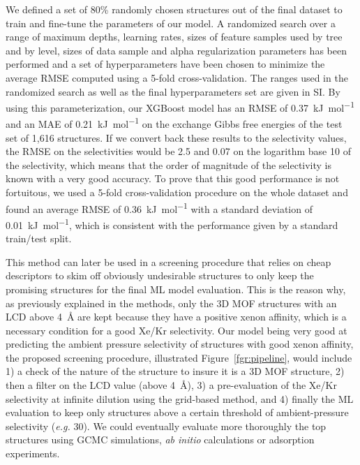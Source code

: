 \documentclass[main]{subfiles}
\begin{document}
We defined a set of {80\%} randomly chosen structures out of the final dataset to train and fine-tune the parameters of our model. A randomized search over a range of maximum depths, learning rates, sizes of feature samples used by tree and by level, sizes of data sample and alpha regularization parameters has been performed and a set of hyperparameters have been chosen to minimize the average RMSE computed using a 5-fold cross-validation. The ranges used in the randomized search as well as the final hyperparameters set are given in SI. By using this parameterization, our XGBoost model has an RMSE of \SI{0.37}{\kilo\joule\per\mole} and an MAE of \SI{0.21}{\kilo\joule\per\mole} on the exchange Gibbs free energies of the test set of 1,616 structures. If we convert back these results to the selectivity values, the RMSE on the selectivities would be 2.5 and 0.07 on the logarithm base 10 of the selectivity, which means that the order of magnitude of the selectivity is known with a very good accuracy. To prove that this good performance is not fortuitous, we used a 5-fold cross-validation procedure on the whole dataset and found an average RMSE of \SI{0.36}{\kilo\joule\per\mole} with a standard deviation of \SI{0.01}{\kilo\joule\per\mole}, which is consistent with the performance given by a standard train/test split.

This method can later be used in a screening procedure that relies on cheap descriptors to skim off obviously undesirable structures to only keep the promising structures for the final ML model evaluation. This is the reason why, as previously explained in the methods, only the 3D MOF structures with an LCD above \SI{4}{\angstrom} are kept because they have a positive xenon affinity, which is a necessary condition for a good Xe/Kr selectivity. Our model being very good at predicting the ambient pressure selectivity of structures with good xenon affinity, the proposed screening procedure, illustrated Figure~\ref{fgr:pipeline}, would include 1) a check of the nature of the structure to insure it is a 3D MOF structure, 2) then a filter on the LCD value (above \SI{4}{\angstrom}), 3) a pre-evaluation of the Xe/Kr selectivity at infinite dilution using the grid-based method, and 4) finally the ML evaluation to keep only structures above a certain threshold of ambient-pressure selectivity (\emph{e.g.} 30). We could eventually evaluate more thoroughly the top structures using GCMC simulations, \emph{ab initio} calculations or adsorption experiments.
\end{document}
